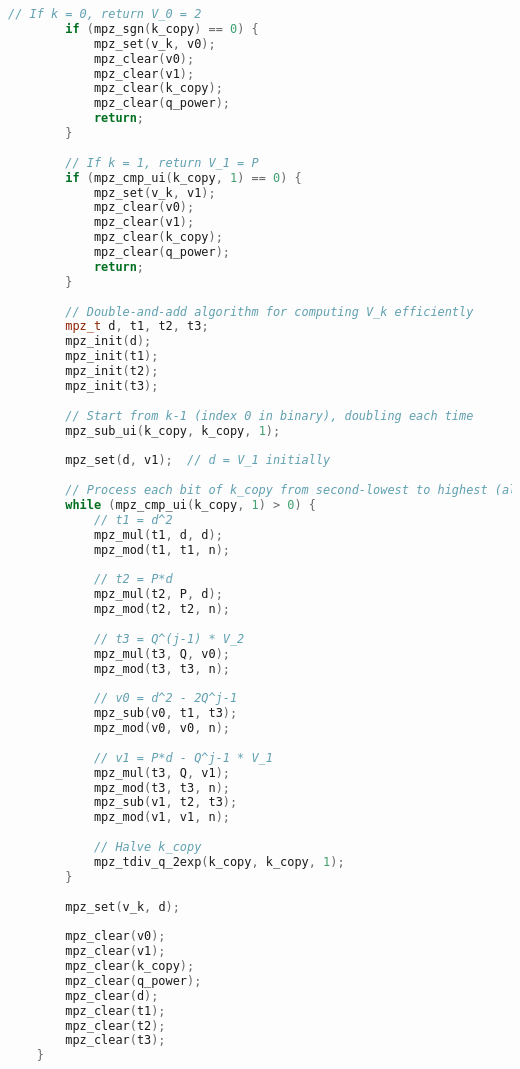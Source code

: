 \begin{lstlisting}[language=C++, caption=Baillie-PSW Test Implementation]
        // If k = 0, return V_0 = 2
        if (mpz_sgn(k_copy) == 0) {
            mpz_set(v_k, v0);
            mpz_clear(v0);
            mpz_clear(v1);
            mpz_clear(k_copy);
            mpz_clear(q_power);
            return;
        }
        
        // If k = 1, return V_1 = P
        if (mpz_cmp_ui(k_copy, 1) == 0) {
            mpz_set(v_k, v1);
            mpz_clear(v0);
            mpz_clear(v1);
            mpz_clear(k_copy);
            mpz_clear(q_power);
            return;
        }
        
        // Double-and-add algorithm for computing V_k efficiently
        mpz_t d, t1, t2, t3;
        mpz_init(d);
        mpz_init(t1);
        mpz_init(t2);
        mpz_init(t3);
        
        // Start from k-1 (index 0 in binary), doubling each time
        mpz_sub_ui(k_copy, k_copy, 1);
        
        mpz_set(d, v1);  // d = V_1 initially
        
        // Process each bit of k_copy from second-lowest to highest (already handled bit 0)
        while (mpz_cmp_ui(k_copy, 1) > 0) {
            // t1 = d^2
            mpz_mul(t1, d, d);
            mpz_mod(t1, t1, n);
            
            // t2 = P*d
            mpz_mul(t2, P, d);
            mpz_mod(t2, t2, n);
            
            // t3 = Q^(j-1) * V_2
            mpz_mul(t3, Q, v0);
            mpz_mod(t3, t3, n);
            
            // v0 = d^2 - 2Q^j-1
            mpz_sub(v0, t1, t3);
            mpz_mod(v0, v0, n);
            
            // v1 = P*d - Q^j-1 * V_1
            mpz_mul(t3, Q, v1);
            mpz_mod(t3, t3, n);
            mpz_sub(v1, t2, t3);
            mpz_mod(v1, v1, n);
            
            // Halve k_copy
            mpz_tdiv_q_2exp(k_copy, k_copy, 1);
        }
        
        mpz_set(v_k, d);
        
        mpz_clear(v0);
        mpz_clear(v1);
        mpz_clear(k_copy);
        mpz_clear(q_power);
        mpz_clear(d);
        mpz_clear(t1);
        mpz_clear(t2);
        mpz_clear(t3);
    }
    

\end{lstlisting}
